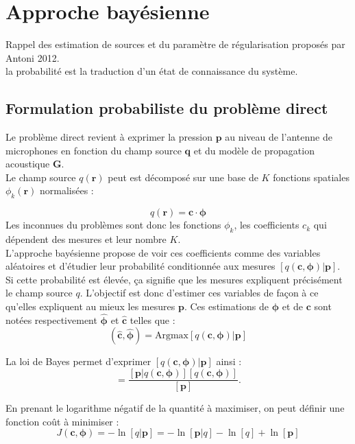 \section{Approche bayésienne}

Rappel des estimation de sources et du paramètre de régularisation proposés par Antoni 2012.\\

la probabilité est la traduction d'un état de connaissance du système.

\subsection{Formulation probabiliste du problème direct}

Le problème direct revient à exprimer la pression $\bm{p}$ au niveau de l'antenne de microphones en fonction du champ source $\bm{q}$ et du modèle de propagation acoustique $\bm{G}$.\\
Le champ source $q(\bm{r})$ peut est décomposé sur une base de $K$ fonctions spatiales $\phi_k(\bm{r})$ normalisées :

\begin{equation}
q(\bm{r}) = \bm{c} \cdot \bm{\phi}
\end{equation}
Les inconnues du problèmes sont donc les fonctions $\phi_k$, les coefficients $c_k$ qui dépendent des mesures et leur nombre $K$.\\

L'approche bayésienne propose de voir ces coefficients comme des variables aléatoires et d'étudier leur probabilité conditionnée aux mesures $[q(\bm{c},\bm{\phi})|\bm{p}]$. Si cette probabilité est élevée, ça signifie que les mesures expliquent précisément le champ source $q$. L'objectif est donc d'estimer ces variables de façon à ce qu'elles expliquent au mieux les mesures $\bm{p}$. Ces estimations de $\bm{\phi}$ et de $\bm{c}$ sont notées respectivement $\bm{\hat{\phi}}$ et $\bm{\hat{c}}$ telles que : 
\begin{equation}
	(\bm{\hat{c}},\bm{\hat{\phi}}) = \text{Argmax}[q(\bm{c},\bm{\phi})|\bm{p}]
\end{equation}

La loi de Bayes permet d'exprimer $[q(\bm{c},\bm{\phi})|\bm{p}]$ ainsi : 
\begin{equation}
[q(\bm{c},\bm{\phi})|\bm{p}]=\frac{[\bm{p}|q(\bm{c},\bm{\phi})][q(\bm{c},\bm{\phi})]}{[\bm{p}]}.
\end{equation}

En prenant le logarithme négatif de la quantité à maximiser, on peut définir une fonction coût à minimiser : 
\begin{equation}
	J(\bm{c},\bm{\phi}) = - \ln[q|\bm{p}] = -\ln[\bm{p}|q]-\ln[q]+\ln[\bm{p}]
\end{equation}

